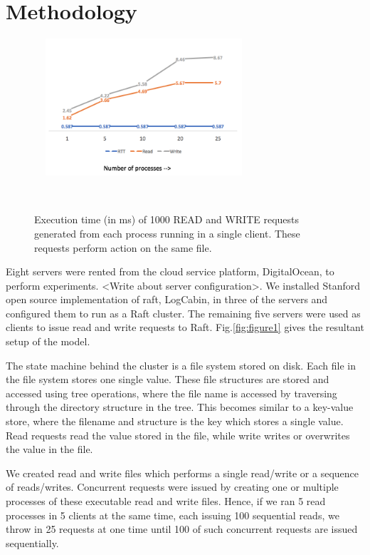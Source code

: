 \section{Methodology}

\begin{figure}
\centering
\includegraphics[height=2in, width=3.2in]{images/F_OneClient.png}
\caption{Execution time (in ms) of 1000 READ and WRITE requests generated from each process running in a single client. These requests perform action on the same file.}~\label{fig:figure2}
\end{figure}


Eight servers were rented from the cloud service platform, DigitalOcean, to perform experiments. <Write about server configuration>. We installed Stanford open source implementation of raft, LogCabin, in three of the servers and configured them to run as a Raft cluster. The remaining five servers were used as clients to issue read and write requests to Raft. Fig.\ref{fig:figure1} gives the resultant setup of the model.

The state machine behind the cluster is a file system stored on disk. Each file in the file system stores one single value. These file structures are stored and accessed using tree operations, where the file name is accessed by traversing through the directory structure in the tree. This becomes similar to a key-value store, where the filename and structure is the key which stores a single value. Read requests read the value stored in the file, while write writes or overwrites the value in the file. 

We created read and write files which performs a single read/write or a sequence of reads/writes. Concurrent requests were issued by creating one or multiple processes of these executable read and write files. Hence, if we ran 5 read processes in 5 clients at the same time, each issuing 100 sequential reads, we throw in 25 requests at one time until 100 of such concurrent requests are issued sequentially.



 

